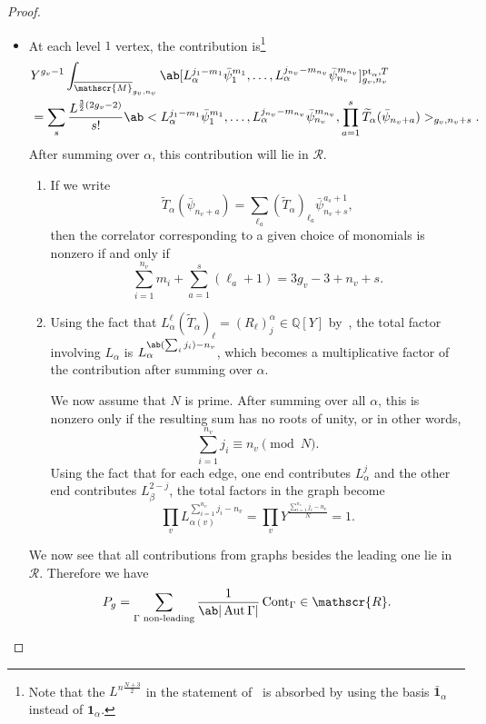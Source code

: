 \documentclass[10pt]{amsart}
\theoremstyle{definition}
\theoremstyle{remark}
\theoremstyle{plain}
\theoremstyle{definition}
\theoremstyle{remark}
\newcommand{\Q}{\mathbb{Q}}
\newcommand{\msc}[1]{\mathscr{#1}}
\newcommand{\mbf}[1]{\mathbf{#1}}
\newcommand{\mr}[1]{\mathrm{#1}}
\newcommand{\on}[1]{\operatorname{#1}}
\newcommand{\ol}[1]{\overline{#1}}
\newcommand{\wt}[1]{\widetilde{#1}}
\newcommand{\1}{\mathbf{1}}
\newcommand{\2}{\mathbf{2}}
\newcommand{\3}{\mathbf{3}}
\newcommand{\pt}{\mr{pt}}
\DeclareMathOperator{\Aut}{Aut}
\numberwithin{equation}{section}
\begin{document}
\begin{proof}
\begin{itemize}
        \item At each level $1$ vertex, the contribution is\footnote{Note that the $L^{n\frac{N+3}{2}}$ in the statement of~ is absorbed by using the basis $\bar{\mbf{1}}_{\alpha}$ instead of $\mbf{1}_{\alpha}$.}
            \begin{align*}
                &Y^{g_v-1} \int_{\ol{\msc{M}}_{g_v, n_v}} \ab[L_{\alpha}^{j_1-m_1} \bar{\psi}_1^{m_1}, \ldots, L_{\alpha}^{j_{n_v} - m_{n_v}} \bar{\psi}_{n_v}^{m_{n_v}}]_{g_v, n_v}^{\pt_{\alpha}, T} \\
                &= \sum_s \frac{L^{\frac{3}{2}(2g_v-2)}}{s!} \ab<L_{\alpha}^{j_1-m_1}\bar{\psi}_1^{m_1}, \ldots, L_{\alpha}^{j_{n_v} - m_{n_v}} \bar{\psi}_{n_v}^{m_{n_v}}, \prod_{a=1}^s \wt{T}_{\alpha}(\bar{\psi}_{n_v+a})>_{g_v, n_v+s}.
            \end{align*}
            After summing over $\alpha$, this contribution will lie in $\msc{R}$. 
            \begin{enumerate}
                \item If we write
                    \[ \wt{T}_{\alpha}(\bar{\psi}_{n_v+a}) = \sum_{\ell_a} (\wt{T}_{\alpha})_{\ell_a} \bar{\psi}_{n_v+s}^{a_s+1}, \]
                    then the correlator corresponding to a given choice of monomials is nonzero if and only if
                    \[ \sum_{i=1}^{n_v} m_i + \sum_{a=1}^s (\ell_a + 1) = 3g_v-3+n_v+s. \]
                \item Using the fact that $L_{\alpha}^{\ell} (\wt{T}_{\alpha})_{\ell} = (R_{\ell})_j^{\alpha} \in \Q[Y]$ by~, the total factor involving $L_{\alpha}$ is $L_{\alpha}^{\ab(\sum_i j_i) - n_v}$, which becomes a multiplicative factor of the contribution after summing over $\alpha$.

                    We now assume that $N$ is prime. After summing over all $\alpha$, this is nonzero only if the resulting sum has no roots of unity, or in other words,
                    \[ \sum_{i=1}^{n_v} j_i \equiv n_v \pmod{N}. \]
                    Using the fact that for each edge, one end contributes $L_{\alpha}^j$ and the other end contributes $L_{\beta}^{2-j}$, the total factors in the graph become
                    \[ \prod_{v} L_{\alpha(v)}^{\sum_{i=1}^{n_v} j_i - n_v} = \prod_{v} Y^{\frac{\sum_{i=1}^{n_v} j_i - n_v}{N}} = 1. \]
            \end{enumerate}
            We now see that all contributions from graphs besides the leading one lie in $\msc{R}$. Therefore we have
            \[ P_g = \sum_{\Gamma \text{ non-leading}} \frac{1}{\ab|\Aut\Gamma|} \on{Cont}_{\Gamma} \in \msc{R}. \qedhere \]
    \end{itemize}
\end{proof}
\end{document}
